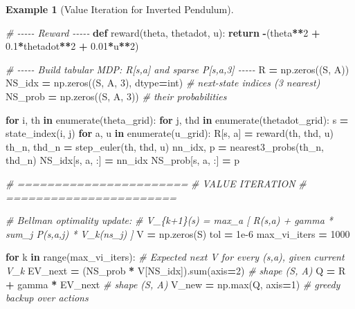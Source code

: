 \documentclass[
]{book}
\newenvironment{Shaded}{\begin{snugshade}}{\end{snugshade}}
\newcommand{\BuiltInTok}[1]{#1}
\newcommand{\CommentTok}[1]{\textcolor[rgb]{0.56,0.35,0.01}{\textit{#1}}}
\newcommand{\ControlFlowTok}[1]{\textcolor[rgb]{0.13,0.29,0.53}{\textbf{#1}}}
\newcommand{\DecValTok}[1]{\textcolor[rgb]{0.00,0.00,0.81}{#1}}
\newcommand{\FloatTok}[1]{\textcolor[rgb]{0.00,0.00,0.81}{#1}}
\newcommand{\KeywordTok}[1]{\textcolor[rgb]{0.13,0.29,0.53}{\textbf{#1}}}
\newcommand{\NormalTok}[1]{#1}
\newcommand{\OperatorTok}[1]{\textcolor[rgb]{0.81,0.36,0.00}{\textbf{#1}}}
\theoremstyle{definition}
\theoremstyle{definition}
\newtheorem{example}{Example}[chapter]
\theoremstyle{definition}
\theoremstyle{definition}
\theoremstyle{remark}
\begin{document}
\begin{example}[Value Iteration for Inverted Pendulum]
\begin{Shaded}
\begin{Highlighting}[]
\CommentTok{\# {-}{-}{-}{-}{-} Reward {-}{-}{-}{-}{-}}
\KeywordTok{def}\NormalTok{ reward(theta, thetadot, u):}
    \ControlFlowTok{return} \OperatorTok{{-}}\NormalTok{(theta}\OperatorTok{**}\DecValTok{2} \OperatorTok{+} \FloatTok{0.1}\OperatorTok{*}\NormalTok{thetadot}\OperatorTok{**}\DecValTok{2} \OperatorTok{+} \FloatTok{0.01}\OperatorTok{*}\NormalTok{u}\OperatorTok{**}\DecValTok{2}\NormalTok{)}

\CommentTok{\# {-}{-}{-}{-}{-} Build tabular MDP: R[s,a] and sparse P[s,a,3] {-}{-}{-}{-}{-}}
\NormalTok{R }\OperatorTok{=}\NormalTok{ np.zeros((S, A))}
\NormalTok{NS\_idx }\OperatorTok{=}\NormalTok{ np.zeros((S, A, }\DecValTok{3}\NormalTok{), dtype}\OperatorTok{=}\BuiltInTok{int}\NormalTok{)   }\CommentTok{\# next{-}state indices (3 nearest)}
\NormalTok{NS\_prob }\OperatorTok{=}\NormalTok{ np.zeros((S, A, }\DecValTok{3}\NormalTok{))             }\CommentTok{\# their probabilities}

\ControlFlowTok{for}\NormalTok{ i, th }\KeywordTok{in} \BuiltInTok{enumerate}\NormalTok{(theta\_grid):}
    \ControlFlowTok{for}\NormalTok{ j, thd }\KeywordTok{in} \BuiltInTok{enumerate}\NormalTok{(thetadot\_grid):}
\NormalTok{        s }\OperatorTok{=}\NormalTok{ state\_index(i, j)}
        \ControlFlowTok{for}\NormalTok{ a, u }\KeywordTok{in} \BuiltInTok{enumerate}\NormalTok{(u\_grid):}
\NormalTok{            R[s, a] }\OperatorTok{=}\NormalTok{ reward(th, thd, u)}
\NormalTok{            th\_n, thd\_n }\OperatorTok{=}\NormalTok{ step\_euler(th, thd, u)}
\NormalTok{            nn\_idx, p }\OperatorTok{=}\NormalTok{ nearest3\_probs(th\_n, thd\_n)}
\NormalTok{            NS\_idx[s, a, :] }\OperatorTok{=}\NormalTok{ nn\_idx}
\NormalTok{            NS\_prob[s, a, :] }\OperatorTok{=}\NormalTok{ p}

\CommentTok{\# =======================}
\CommentTok{\#       VALUE ITERATION}
\CommentTok{\# =======================}

\CommentTok{\# Bellman optimality update:}
\CommentTok{\# V\_\{k+1\}(s) = max\_a [ R(s,a) + gamma * sum\_j P(s,a,j) * V\_k(ns\_j) ]}
\NormalTok{V }\OperatorTok{=}\NormalTok{ np.zeros(S)}
\NormalTok{tol }\OperatorTok{=} \FloatTok{1e{-}6}
\NormalTok{max\_vi\_iters }\OperatorTok{=} \DecValTok{1000}

\ControlFlowTok{for}\NormalTok{ k }\KeywordTok{in} \BuiltInTok{range}\NormalTok{(max\_vi\_iters):}
    \CommentTok{\# Expected next V for every (s,a), given current V\_k}
\NormalTok{    EV\_next }\OperatorTok{=}\NormalTok{ (NS\_prob }\OperatorTok{*}\NormalTok{ V[NS\_idx]).}\BuiltInTok{sum}\NormalTok{(axis}\OperatorTok{=}\DecValTok{2}\NormalTok{)   }\CommentTok{\# shape (S, A)}
\NormalTok{    Q }\OperatorTok{=}\NormalTok{ R }\OperatorTok{+}\NormalTok{ gamma }\OperatorTok{*}\NormalTok{ EV\_next                       }\CommentTok{\# shape (S, A)}
\NormalTok{    V\_new }\OperatorTok{=}\NormalTok{ np.}\BuiltInTok{max}\NormalTok{(Q, axis}\OperatorTok{=}\DecValTok{1}\NormalTok{)                     }\CommentTok{\# greedy backup over actions}


\end{Highlighting}
\end{Shaded}
\end{example}
\end{document}
